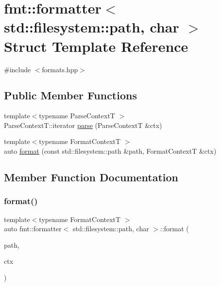 \hypertarget{structfmt_1_1formatter_3_01std_1_1filesystem_1_1path_00_01char_01_4}{}\section{fmt\+:\+:formatter$<$ std\+:\+:filesystem\+:\+:path, char $>$ Struct Template Reference}
\label{structfmt_1_1formatter_3_01std_1_1filesystem_1_1path_00_01char_01_4}


{\ttfamily \#include $<$formats.\+hpp$>$}

\subsection*{Public Member Functions}
\begin{DoxyCompactItemize}
\item 
{\footnotesize template$<$typename Parse\+ContextT $>$ }\\Parse\+Context\+T\+::iterator \mbox{\hyperlink{structfmt_1_1formatter_3_01std_1_1filesystem_1_1path_00_01char_01_4_abf1d50cd902f21dce74ec52eb20c9519}{parse}} (Parse\+ContextT \&ctx)
\item 
{\footnotesize template$<$typename Format\+ContextT $>$ }\\auto \mbox{\hyperlink{structfmt_1_1formatter_3_01std_1_1filesystem_1_1path_00_01char_01_4_aa3e8ffffdd239f1be9edba7881b76e10}{format}} (const std\+::filesystem\+::path \&path, Format\+ContextT \&ctx)
\end{DoxyCompactItemize}


\subsection{Member Function Documentation}
\mbox{\label{structfmt_1_1formatter_3_01std_1_1filesystem_1_1path_00_01char_01_4_aa3e8ffffdd239f1be9edba7881b76e10}} 
\subsubsection{\texorpdfstring{format()}{format()}}
{\footnotesize\ttfamily template$<$typename Format\+ContextT $>$ \\
auto fmt\+::formatter$<$ std\+::filesystem\+::path, char $>$\+::format (\begin{DoxyParamCaption}\item[{const std\+::filesystem\+::path \&}]{path,  }\item[{Format\+ContextT \&}]{ctx }\end{DoxyParamCaption})}

